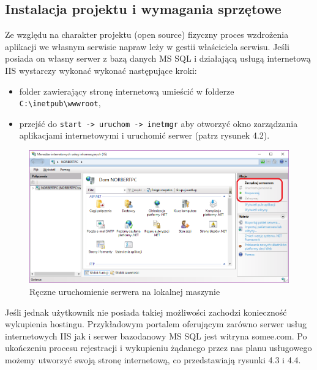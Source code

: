 \documentclass[a4paper,11pt]{article}
\begin{document}
\subsection{Instalacja projektu i wymagania sprzętowe}
Ze względu na charakter projektu (open source) fizyczny proces wzdrożenia aplikacji we własnym serwisie napraw leży w gestii właściciela serwisu. Jeśli posiada on własny serwer z bazą danych MS SQL i działającą usługą internetową IIS	wystarczy wykonać wykonać następujące kroki:
\begin{itemize}
	\item folder zawierający stronę internetową umieścić w folderze \texttt{C:\textbackslash inetpub\textbackslash wwwroot},
	\item przejść do \texttt{start -> uruchom -> inetmgr} aby otworzyć okno zarządzania aplikacjami internetowymi i uruchomić serwer (patrz rysunek 4.2).
\end{itemize}
\begin{figure}[h!]
	\centering
	\includegraphics[width=\textwidth,height=0.6\textheight]{inetMgr.png}
	\caption{Ręczne uruchomienie serwera na lokalnej maszynie}
\end{figure}
Jeśli jednak użytkownik nie posiada takiej możliwości zachodzi konieczność wykupienia hostingu. Przykładowym portalem oferującym zarówno serwer usług internetowych IIS jak i serwer bazodanowy MS SQL jest witryna somee.com. Po ukończeniu procesu rejestracji i wykupieniu żądanego przez nas planu usługowego możemy utworzyć swoją stronę internetową, co przedstawiają rysunki 4.3 i 4.4.
\end{document}
